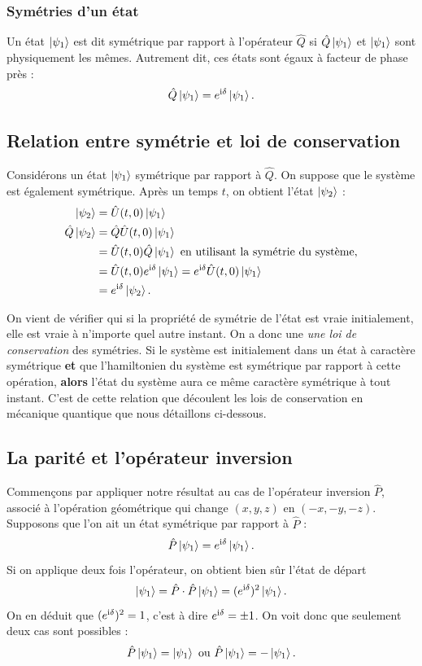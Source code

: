 \subsubsection{Symétries d'un état}
Un état $\ket{\psi_1}$ est dit symétrique par rapport à l'opérateur $\hat{Q}$ si $\hat{Q}\ket{\psi_1}$ et $\ket{\psi_1}$ sont physiquement les mêmes. Autrement dit, ces états sont égaux à facteur de phase près :
\[\hat{Q}\ket{\psi_1} = e^{\mathrm{i}\delta}\ket{\psi_1}.\]

\subsection{Relation entre symétrie et loi de conservation}
Considérons un état $\ket{\psi_1}$ symétrique par rapport à $\hat{Q}$. On suppose que le système est également symétrique. Après un temps $t$, on obtient l'état $\ket{\psi_2}$ :
\begin{align}
\ket{\psi_2}&=\hat{U}(t,0)\ket{\psi_1}\\
\hat{Q}\ket{\psi_2}&=\hat{Q}\hat{U}(t,0)\ket{\psi_1}\\
&=\hat{U}(t,0)\hat{Q}\ket{\psi_1} \mbox{ en utilisant la symétrie du système,}\\
&=\hat{U}(t,0)e^{\mathrm{i}\delta}\ket{\psi_1}=e^{\mathrm{i}\delta}\hat{U}(t,0)\ket{\psi_1}\\
&=e^{\mathrm{i}\delta}\ket{\psi_2}.
\end{align}

On vient de vérifier qui si la propriété de symétrie de l'état est vraie initialement, elle est vraie à n'importe quel autre instant. On a donc une \textit{une loi de conservation} des symétries. Si le système est initialement dans un état à caractère symétrique \textbf{et} que l'hamiltonien du système est symétrique par rapport à cette opération, \textbf{alors} l'état du système aura ce même caractère symétrique à tout instant. C'est de cette relation que découlent les lois de conservation en mécanique quantique que nous détaillons ci-dessous.

\subsection{La parité et l'opérateur inversion}
Commençons par appliquer notre résultat au cas de l'opérateur inversion $\hat{P}$, associé à l'opération géométrique qui change $(x,y,z)$ en $(-x,-y,-z)$. Supposons que l'on ait un état symétrique par rapport à $\hat{P}$ : 
\begin{equation}
\hat{P}\ket{\psi_1} = e^{\mathrm{i}\delta}\ket{\psi_1}.
\end{equation}
Si on applique deux fois l'opérateur, on obtient bien sûr l'état de départ
\begin{equation}
\ket{\psi_1} = \hat{P}\cdot\hat{P}\ket{\psi_1} = (e^{\mathrm{i}\delta})^2\ket{\psi_1}.
\end{equation}
On en déduit que $(e^{\mathrm{i}\delta})^2=1$, c'est à dire $e^{\mathrm{i}\delta}=\pm1$. On voit donc que seulement deux cas sont possibles :
\begin{equation}
\hat{P}\ket{\psi_1} = \ket{\psi_1} \mbox{ ou } \hat{P}\ket{\psi_1} = -\ket{\psi_1}.
\end{equation}

